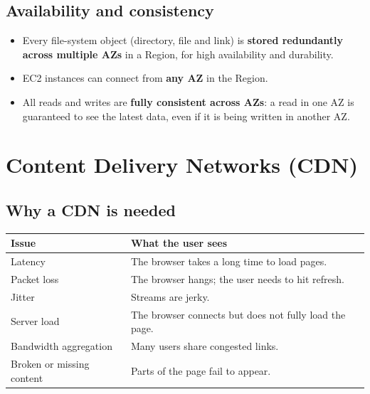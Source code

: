 \documentclass[11pt,a4paper]{article}
\begin{document}

\subsection{Availability and consistency}

\begin{itemize}\itemsep2pt
  \item Every file-system object (directory, file and link) is \textbf{stored redundantly
        across multiple AZs} in a Region, for high availability and durability.
  \item EC2 instances can connect from \textbf{any AZ} in the Region.
  \item All reads and writes are \textbf{fully consistent across AZs}: a read in one AZ is
        guaranteed to see the latest data, even if it is being written in another AZ.
\end{itemize}

\section{Content Delivery Networks (CDN)}


\subsection{Why a CDN is needed}



\begin{tabularx}{\textwidth}{@{}lX@{}}
\toprule
\rowcolor{tablehead}\textbf{Issue} & \textbf{What the user sees} \\
\midrule
Latency & The browser takes a long time to load pages. \\
Packet loss & The browser hangs; the user needs to hit refresh. \\
Jitter & Streams are jerky. \\
Server load & The browser connects but does not fully load the page. \\
Bandwidth aggregation & Many users share congested links. \\
Broken or missing content & Parts of the page fail to appear. \\
\bottomrule
\end{tabularx}
\end{document}
